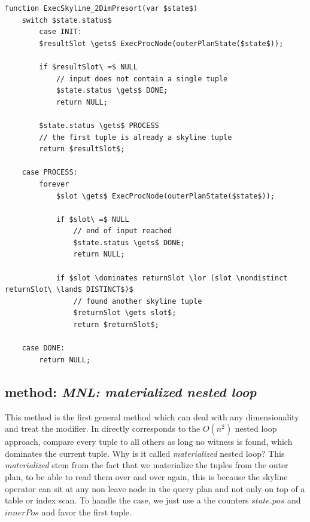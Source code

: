 \pagebreak[4]
\begin{lstlisting}[language=pseudo,
caption={Pseudo-code for Special case: 2 dimensional with presort},
label={code:2dimpresort}
]
function ExecSkyline_2DimPresort(var $state$)
	switch $state.status$
        case INIT:
		$resultSlot \gets$ ExecProcNode(outerPlanState($state$));

		if $resultSlot\ =$ NULL
			// input does not contain a single tuple
			$state.status \gets$ DONE;
			return NULL;

		$state.status \gets$ PROCESS
		// the first tuple is already a skyline tuple
		return $resultSlot$;

	case PROCESS:
		forever
			$slot \gets$ ExecProcNode(outerPlanState($state$));

			if $slot\ =$ NULL
				// end of input reached
				$state.status \gets$ DONE;
				return NULL;

			if $slot \dominates returnSlot \lor (slot \nondistinct returnSlot\ \land$ DISTINCT$)$
				// found another skyline tuple
				$returnSlot \gets slot$;
				return $returnSlot$;

	case DONE:
		return NULL;
\end{lstlisting}

\subsection{\Naive method: \emph{MNL: materialized nested loop}}
\label{sec:mnl}
This method is the first general method which can deal with any
dimensionality and treat the  modifier.  In
directly corresponds to the \naive $O(n^2)$ nested loop approach,
compare every tuple to all others as long no witness is found, which
dominates the current tuple.  Why is it called \emph{materialized}
nested loop?  This \emph{materialized} stem from the fact that we
materialize the tuples from the outer plan, to be able to read them
over and over again, this is because the skyline operator can sit at
any non leave node in the query plan and not only on top of a table or
index scan.  To handle the  case, we just use a
the counters $state.pos$ and $innerPos$ and favor the first tuple.

